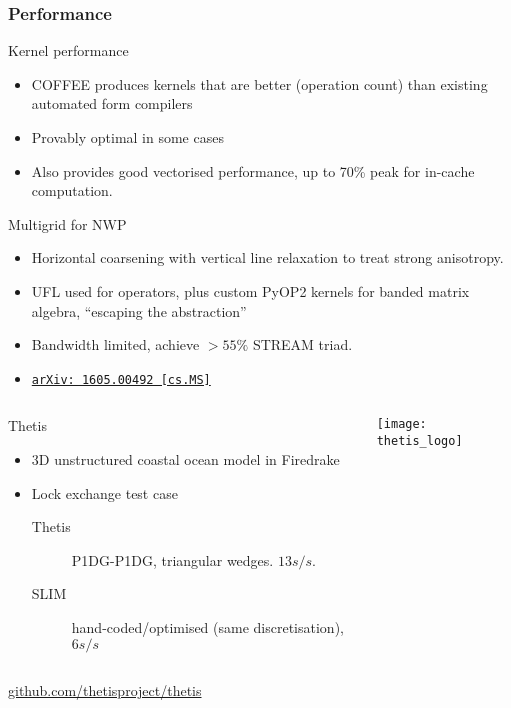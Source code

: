 \documentclass[presentation]{beamer}
\newcommand{\arxivlink}[2]{%
  \href{http://www.arxiv.org/abs/#1}%
  {{\small\texttt{arXiv:\,#1\,[#2]}}}%
}
\begin{document}
\begin{frame}[allowframebreaks]
  \frametitle{Performance}

  \begin{block}{Kernel performance}
    \begin{itemize}
    \item COFFEE produces kernels that are better (operation count)
      than existing automated form compilers
    \item Provably optimal in some cases
    \item Also provides good vectorised performance, up to 70\% peak
      for in-cache computation.
    \end{itemize}
  \end{block}

\pagebreak

  \begin{block}{Multigrid for NWP}
    \begin{itemize}
    \item Horizontal coarsening with vertical line relaxation to treat
      strong anisotropy.
    \item UFL used for operators, plus custom PyOP2 kernels for banded
      matrix algebra, ``escaping the abstraction''
    \item Bandwidth limited, achieve $> 55\%$ STREAM triad.
    \item \cite{Mitchell:2016} \arxivlink{1605.00492}{cs.MS}
    \end{itemize}
  \end{block}

\pagebreak

  \begin{columns}
    \begin{column}{0.7\textwidth}
      \begin{block}{Thetis}
        \begin{itemize}
        \item 3D unstructured coastal ocean model in Firedrake
        \item Lock exchange test case
          \begin{description}
          \item[Thetis] P1DG-P1DG, triangular wedges.  $13s/s$.
          \item[SLIM] hand-coded/optimised (same discretisation),
            $6s/s$
          \end{description}
        \end{itemize}
      \end{block}
    \end{column}
    \begin{column}[t]{0.3\textwidth}
      \texttt{[image: thetis\_logo]}
    \end{column}
  \end{columns}
  \begin{center}
    \url{github.com/thetisproject/thetis}    
  \end{center}
\end{frame}
\end{document}
